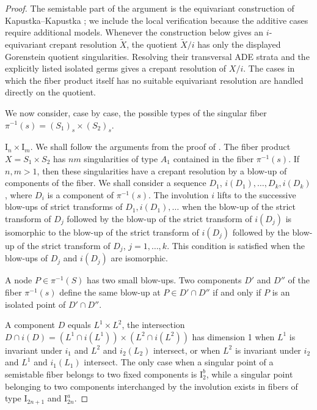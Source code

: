 \documentclass[a4paper]{amsart}
\theoremstyle{plain}
\theoremstyle{definition}
\theoremstyle{remark}
\numberwithin{equation}{section}
\begin{document}
\begin{proof}
The semistable part of the argument is the equivariant construction of
Kapustka--Kapustka \cite{KK}; we include the local verification because the
additive cases require additional models.  Whenever the construction
below gives an $i$-equivariant crepant resolution $\widetilde X$, the
quotient $\widetilde X/i$ has only the displayed Gorenstein quotient
singularities.  Resolving their transversal ADE strata and the explicitly
listed isolated germs gives a crepant resolution of $X/i$.  The cases in
which the fiber product itself has no suitable equivariant resolution are
handled directly on the quotient.

We now consider, case by case, the possible types of the singular fiber $\pi^{-1}(s)=(S_{1})_{s}\times (S_{2})_{s}$.

\vspace{2mm}
\medskip
\noindent\emph{$\mathrm{I}_n \times \mathrm{I}_{m}$}.
We shall follow the arguments from the proof of \cite[Lemma 6.1]{Schoen}.
The fiber product $X=S_{1}\times S_{2}$ has $nm$ singularities of type $A_{1}$ contained in the fiber $\pi^{-1}(s)$.
If $n,m>1$, then these singularities have a crepant resolution by a blow-up of components of the fiber. We shall consider a sequence $D_{1}$, $i(D_{1}),\dots,D_{k},i(D_{k})$, where $D_{i}$ is a component of $\pi^{-1}(s)$. The involution $i$ lifts to the successive blow-ups of strict transforms of $D_{1}, i(D_{1}), \dots$ when the blow-up of the strict transform of $D_{j}$ followed by the blow-up of the strict transform of $i(D_{j})$ is isomorphic to the blow-up of the strict transform of $i(D_{j})$ followed by the blow-up of the strict transform of $D_{j}$, $j=1,\dots,k$. This condition is satisfied when the blow-ups of $D_{j}$ and $i(D_{j})$ are isomorphic.

A node $P\in\pi^{-1}(S)$ has two small blow-ups. Two components $D'$ and $D''$ of the fiber $\pi^{-1}(s)$ define the same blow-up at $P\in D'\cap D''$
if and only if $P$ is an isolated point of $D'\cap D''$.

A component $D$ equals $L^{1}\times L^{2}$, the intersection
$D\cap i(D) = (L^{1}\cap i(L^{1})) \times (L^{2}\cap i(L^{2}))$ has dimension 1 when $L^{1}$ is invariant under $i_{1}$ and $L^{2}$ and $i_{2}(L_{2})$ intersect, or when $L^{2}$ is invariant under $i_{2}$ and $L^{1}$ and $i_{1}(L_{1})$ intersect. The only case when a singular point of a semistable fiber belongs to two fixed components is $\mathrm{I}_{2}^{b}$, while a singular point belonging to two components interchanged by the involution exists in fibers of type $\mathrm{I}_{2n+1}$ and $\mathrm{I}_{2n}^{a}$.


\end{proof}
\end{document}
